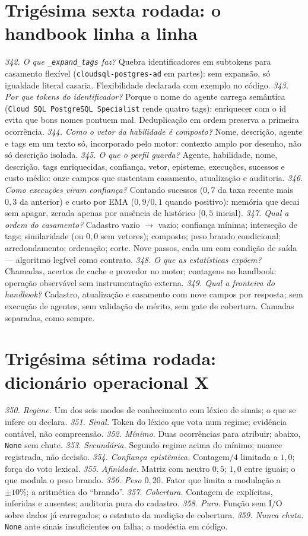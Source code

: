 \section{Trigésima sexta rodada: o handbook linha a linha}
\textit{342. O que \texttt{\_expand\_tags} faz?} Quebra identificadores em subtokens para casamento flexível (\texttt{cloudsql-postgres-ad} em partes): sem expansão, só igualdade literal casaria. Flexibilidade declarada com exemplo no código.
\textit{343. Por que tokens do identificador?} Porque o nome do agente carrega semântica (\texttt{Cloud SQL PostgreSQL Specialist} rende quatro tags): enriquecer com o id evita que bons nomes pontuem mal. Deduplicação em ordem preserva a primeira ocorrência.
\textit{344. Como o vetor da habilidade é composto?} Nome, descrição, agente e tags em um texto só, incorporado pelo motor: contexto amplo por desenho, não só descrição isolada.
\textit{345. O que o perfil guarda?} Agente, habilidade, nome, descrição, tags enriquecidas, confiança, vetor, episteme, execuções, sucessos e custo médio: onze campos que sustentam casamento, atualização e auditoria.
\textit{346. Como execuções viram confiança?} Contando sucessos ($0{,}7$ da taxa recente mais $0{,}3$ da anterior) e custo por EMA ($0{,}9/0{,}1$ quando positivo): memória que decai sem apagar, zerada apenas por ausência de histórico ($0{,}5$ inicial).
\textit{347. Qual a ordem do casamento?} Cadastro vazio $\to$ vazio; confiança mínima; interseção de tags; similaridade (ou $0{,}0$ sem vetores); composto; peso brando condicional; arredondamento; ordenação; corte. Nove passos, cada um com condição de saída --- algoritmo legível como contrato.
\textit{348. O que as estatísticas expõem?} Chamadas, acertos de cache e provedor no motor; contagens no handbook: operação observável sem instrumentação externa.
\textit{349. Qual a fronteira do handbook?} Cadastro, atualização e casamento com nove campos por resposta; sem execução de agentes, sem validação de mérito, sem gate de cobertura. Camadas separadas, como sempre.
\section{Trigésima sétima rodada: dicionário operacional X}
\textit{350. Regime.} Um dos seis modos de conhecimento com léxico de sinais; o que se infere ou declara.
\textit{351. Sinal.} Token do léxico que vota num regime; evidência contável, não compreensão.
\textit{352. Mínimo.} Duas ocorrências para atribuir; abaixo, \texttt{None} sem chute.
\textit{353. Secundária.} Segundo regime acima do mínimo; nuance registrada, não decisão.
\textit{354. Confiança epistêmica.} Contagem$/4$ limitada a $1{,}0$; força do voto lexical.
\textit{355. Afinidade.} Matriz com neutro $0{,}5$; $1{,}0$ entre iguais; o que modula o peso brando.
\textit{356. Peso $0{,}20$.} Fator que limita a modulação a $\pm10\%$; a aritmética do ``brando''.
\textit{357. Cobertura.} Contagem de explícitas, inferidas e ausentes; auditoria pura do cadastro.
\textit{358. Puro.} Função sem I/O sobre dados já carregados; o estatuto da medição de cobertura.
\textit{359. Nunca chuta.} \texttt{None} ante sinais insuficientes ou falha; a modéstia em código.
